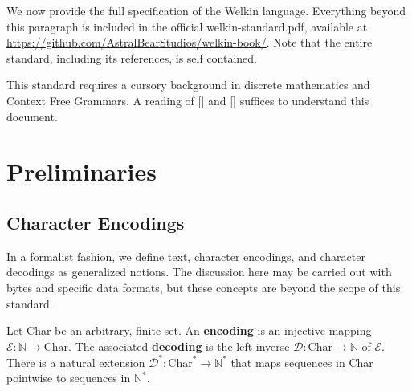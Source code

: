 

We now provide the full specification of the Welkin language. Everything beyond this paragraph is included in the official welkin-standard.pdf, available at \url{https://github.com/AstralBearStudios/welkin-book/}. Note that the entire standard, including its references, is self contained.


This standard requires a cursory background in discrete mathematics and Context Free Grammars. A reading of [] and [] suffices to understand this document.

\section{Preliminaries}

\newcommand*{\chars}{\mathrm{CHAR}}
\newcommand*{\numbers}{\mathrm{NUMBER}}
\newcommand*{\whitespaces}{\mathrm{WHITE\_SPACES}}
\newcommand*{\reserved}{\mathrm{RESERVED}}
\newcommand*{\strings}{\mathrm{STRING}}
\newcommand*{\term}{\mathrm{term}}
\newcommand*{\terms}{\mathrm{terms}}
\newcommand*{\delimiters}{\mathrm{DELIMITERS}}
\newcommand*{\encoding}{\mathcal{E}}
\newcommand*{\decoding}{\mathcal{D}}

\newcommand*{\scope}{\textrm{scope}}

\subsection{Character Encodings}
In a formalist fashion, we define text, character encodings, and character decodings as generalized notions. The discussion here may be carried out with bytes and specific data formats, but these concepts are beyond the scope of this standard.

Let Char be an arbitrary, finite set. An \textbf{encoding} is an injective mapping $\encoding : \mathbb{N} \to \textrm{Char}.$ The associated \textbf{decoding} is the left-inverse $\decoding: \mathrm{Char} \to \mathbb{N}$ of $\encoding.$ There is a natural extension $\decoding^{*}: \textrm{Char}^{*} \to \mathbb{N}^{*}$
that maps sequences in Char pointwise to sequences in $\mathbb{N}^{*}.$


